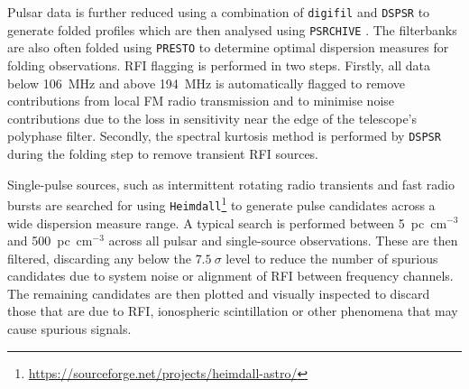 Pulsar data is further reduced using a combination of \texttt{digifil} and \texttt{DSPSR} \citep{vanStraten2011} to generate folded profiles which are then analysed using \texttt{PSRCHIVE} \citep{Hotan2004}. The filterbanks are also often folded using \texttt{PRESTO} \citep{Ransom2001} to determine optimal dispersion measures for folding observations. RFI flagging is performed in two steps. Firstly, all data below 106~MHz and above 194~MHz is automatically flagged to remove contributions from local FM radio transmission and to minimise noise contributions due to the loss in sensitivity near the edge of the telescope's polyphase filter. Secondly, the spectral kurtosis method is performed by \texttt{DSPSR} during the folding step to remove transient RFI sources.

Single-pulse sources, such as intermittent rotating radio transients \citep[RRATs;][]{McLaughlin2006} and fast radio bursts \citep[FRBs;][]{Lorimer2007,Thornton2013} are searched for using \texttt{Heimdall}\footnote{\hyperref[Heimdall]{https://sourceforge.net/projects/heimdall-astro/}} to generate pulse candidates across a wide dispersion measure range. A typical search is performed between 5~pc~cm$^{-3}$ and 500~pc~cm$^{-3}$ across all pulsar and single-source observations. These are then filtered, discarding any below the $7.5~\sigma$ level to reduce the number of spurious candidates due to system noise or alignment of RFI between frequency channels. The remaining candidates are then plotted and visually inspected to discard those that are due to RFI, ionospheric scintillation or other phenomena that may cause spurious signals. 



